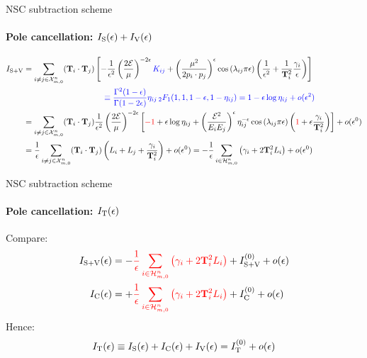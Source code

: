 \begin{frame}{NSC subtraction scheme}
  \framesubtitle{Pole cancellation: $ I_\text{S}(\epsilon) + I_\text{V}(\epsilon) $}

  \small
  \begin{equation*}
    \begin{split}
      I_{\text{S}+\text{V}}
      & = \sum_{i \neq j \in \mathcal{X}^{n}_{m,0}} (\mathbf{T}_i \cdot \mathbf{T}_j) \left[ - \frac{1}{\epsilon^2} \left( \frac{2\mathcal{E}}{\mu} \right)^{-2\epsilon} \textcolor{blue}{K_{ij}} + \left( \frac{\mu^2}{2p_i \cdot p_j} \right)^\epsilon \cos \left( \lambda_{ij} \pi \epsilon \right) \left( \frac{1}{\epsilon^2} + \frac{1}{\mathbf{T}_i^2} \frac{\gamma_i}{\epsilon} \right) \right] \\
      & \qquad \qquad \qquad \qquad \qquad \textcolor{blue}{\equiv \frac{\Gamma^2(1-\epsilon)}{\Gamma(1-2\epsilon)} \eta_{ij} \,{_2F_1}(1,1,1-\epsilon,1-\eta_{ij}) = 1 - \epsilon \log \eta_{ij} + o(\epsilon^2)} \\
      & = \sum_{i \neq j \in \mathcal{X}^{n}_{m,0}} (\mathbf{T}_i \cdot \mathbf{T}_j) \frac{1}{\epsilon^2} \left( \frac{2\mathcal{E}}{\mu} \right)^{-2\epsilon} \left[ \textcolor{red}{-1} + \epsilon \log \eta_{ij} + \left( \frac{\mathcal{E}^2}{E_i E_j} \right)^\epsilon \eta_{ij}^{-\epsilon} \cos \left( \lambda_{ij} \pi \epsilon \right) \left( \textcolor{red}{1} + \epsilon \frac{\gamma_i}{\mathbf{T}_i^2} \right) \right] + o(\epsilon^0) \\
      & = \frac{1}{\epsilon} \sum_{i \neq j \in \mathcal{X}^{n}_{m,0}} (\mathbf{T}_i \cdot \mathbf{T}_j) \left( L_i + L_j + \frac{\gamma_i}{\mathbf{T}_i^2} \right) + o(\epsilon^0) = - \frac{1}{\epsilon} \sum_{i \in \mathcal{H}^{n}_{m,0}} \left( \gamma_i + 2 \mathbf{T}_i^2 L_i \right) + o(\epsilon^0)
    \end{split}
  \end{equation*}

\end{frame}


\begin{frame}{NSC subtraction scheme}
  \framesubtitle{Pole cancellation: $ I_\text{T}(\epsilon) $}

  Compare:
  \begin{equation*}
    \begin{split}
      I_{\text{S}+\text{V}}(\epsilon) = - & \textcolor{red}{\frac{1}{\epsilon} \sum_{i \in \mathcal{H}^{n}_{m,0}} \left( \gamma_i + 2 \mathbf{T}_i^2 L_i \right)} + I_{\text{S}+\text{V}}^{(0)} + o(\epsilon) \\
      I_\text{C}(\epsilon) = + & \textcolor{red}{\frac{1}{\epsilon} \sum_{i \in \mathcal{H}^{n}_{m,0}} \left( \gamma_i + 2 \mathbf{T}_i^2 L_i \right)} + I_\text{C}^{(0)} + o(\epsilon)
    \end{split}
  \end{equation*}
  Hence:
  \begin{equation*}
    I_\text{T}(\epsilon) \equiv I_\text{S}(\epsilon) + I_\text{C}(\epsilon) + I_\text{V}(\epsilon) = I_\text{T}^{(0)} + o(\epsilon)
  \end{equation*}

\end{frame}

